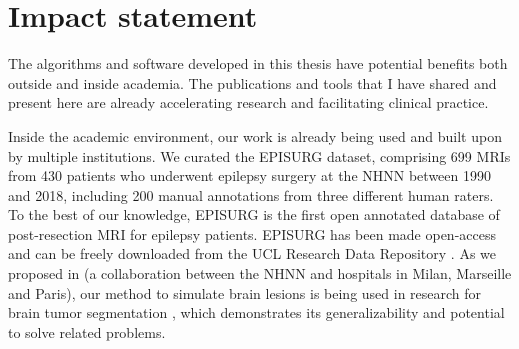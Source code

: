 \chapter{Impact statement}

The algorithms and software developed in this thesis have potential benefits both outside and inside academia.
The publications and tools that I have shared and present here are already accelerating research and facilitating clinical practice.

Inside the academic environment, our work is already being used and built upon by multiple institutions.
We curated the EPISURG dataset, comprising 699 \acp{MRI} from 430 patients who underwent epilepsy surgery at the \ac{NHNN} between 1990 and 2018, including 200 manual annotations from three different human raters.
To the best of our knowledge, EPISURG is the first open annotated database of post-resection \ac{MRI} for epilepsy patients.
EPISURG has been made open-access and can be freely downloaded from the UCL Research Data Repository \cite{perez-garcia_episurg_2020}.
As we proposed in \cite{perez-garcia_self-supervised_2021} (a collaboration between the \ac{NHNN} and hospitals in Milan, Marseille and Paris), our method to simulate brain lesions is being used in research for brain tumor segmentation \cite{zhang_self-supervised_2021}, which demonstrates its generalizability and potential to solve related problems.


